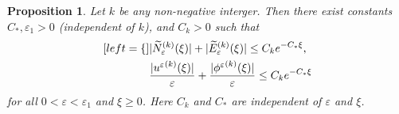 \documentclass{amsart}
\newcommand{\veps}{\varepsilon}
\numberwithin{equation}{section}
\theoremstyle{plain}%
\newtheorem{proposition}[theorem]{Proposition}
\theoremstyle{definition}
\theoremstyle{remark}
\theoremstyle{remark}
\begin{document}
\begin{proposition}\label{Prop1}
Let $k$ be any non-negative interger. Then there exist constants $C_\ast,\veps_1>0$ (independent of $k$), and $C_k>0$ such that 
\begin{subequations}\label{UnifExpDecayn}
\begin{align}[left = \empheqlbrace\,]
& |{\widetilde{N}_\veps}^{(k)}(\xi)|  +  |{\widetilde{E}_\veps}^{(k)}(\xi)| \leq C_k e^{-C_\ast \xi},  \label{UnifExpDecayn1} \\
& \frac{|{u^\veps}^{(k)}(\xi)|}{\veps}  +  \frac{|{\phi^\veps}^{(k)}(\xi)|}{\veps} \leq C_k e^{-C_\ast\xi} \label{UnifExpDecayn2}
\end{align}
\end{subequations}
for all $0<\veps < \veps_1$ and $\xi\geq 0$. Here $C_k$ and $C_\ast$ are independent of $\veps$ and $\xi$.
\end{proposition}
\end{document}
